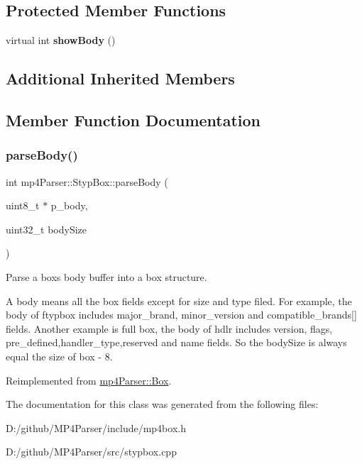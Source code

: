 \subsection*{Protected Member Functions}
\begin{DoxyCompactItemize}
\item 
\mbox{\label{classmp4_parser_1_1_styp_box_af06a495c18bf8fb4ef1998623f572df4}} 
virtual int {\bfseries show\+Body} ()
\end{DoxyCompactItemize}
\subsection*{Additional Inherited Members}


\subsection{Member Function Documentation}
\mbox{\label{classmp4_parser_1_1_styp_box_a69fb40227f9718a745b8ac3c73b38e35}} 
\subsubsection{\texorpdfstring{parseBody()}{parseBody()}}
{\footnotesize\ttfamily int mp4\+Parser\+::\+Styp\+Box\+::parse\+Body (\begin{DoxyParamCaption}\item[{uint8\+\_\+t $\ast$}]{p\+\_\+body,  }\item[{uint32\+\_\+t}]{body\+Size }\end{DoxyParamCaption})\hspace{0.3cm}{\ttfamily [virtual]}}



Parse a box\textquotesingle{}s body buffer into a box structure. 

A body means all the box fields except for size and type filed. For example, the body of ftypbox includes major\+\_\+brand, minor\+\_\+version and compatible\+\_\+brands\mbox{[}\mbox{]} fields. Another example is full box, the body of hdlr includes version, flags, pre\+\_\+defined,handler\+\_\+type,reserved and name fields. So the body\+Size is always equal the size of box -\/ 8. 

Reimplemented from \mbox{\hyperlink{classmp4_parser_1_1_box_a3dd0c084ac65bc77b69ac5ecaf796cb2}{mp4\+Parser\+::\+Box}}.



The documentation for this class was generated from the following files\+:\begin{DoxyCompactItemize}
\item 
D\+:/github/\+M\+P4\+Parser/include/mp4box.\+h\item 
D\+:/github/\+M\+P4\+Parser/src/stypbox.\+cpp\end{DoxyCompactItemize}
